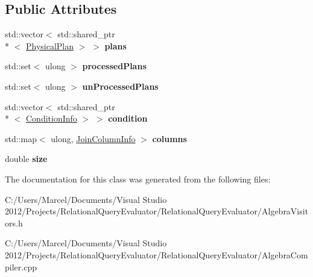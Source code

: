 \subsection*{Public Attributes}
\begin{DoxyCompactItemize}
\item 
\hypertarget{class_join_info_acbddcf9cd01e91396492b94a627bdf69}{std\+::vector$<$ std\+::shared\+\_\+ptr\\*
$<$ \hyperlink{class_physical_plan}{Physical\+Plan} $>$ $>$ {\bfseries plans}}\label{class_join_info_acbddcf9cd01e91396492b94a627bdf69}

\item 
\hypertarget{class_join_info_a584f1ea54151c8e0c506911a6595c7cb}{std\+::set$<$ ulong $>$ {\bfseries processed\+Plans}}\label{class_join_info_a584f1ea54151c8e0c506911a6595c7cb}

\item 
\hypertarget{class_join_info_ac6d0b302590c265ce7f3c47db28bad44}{std\+::set$<$ ulong $>$ {\bfseries un\+Processed\+Plans}}\label{class_join_info_ac6d0b302590c265ce7f3c47db28bad44}

\item 
\hypertarget{class_join_info_a0b9f3b02df4e768208f53c549e0b6e61}{std\+::vector$<$ std\+::shared\+\_\+ptr\\*
$<$ \hyperlink{class_condition_info}{Condition\+Info} $>$ $>$ {\bfseries condition}}\label{class_join_info_a0b9f3b02df4e768208f53c549e0b6e61}

\item 
\hypertarget{class_join_info_a4890e0bbeaf9718d16765b8f408ec1b5}{std\+::map$<$ ulong, \hyperlink{class_join_column_info}{Join\+Column\+Info} $>$ {\bfseries columns}}\label{class_join_info_a4890e0bbeaf9718d16765b8f408ec1b5}

\item 
\hypertarget{class_join_info_a526146b07ef6d1bba7475f7998bf0588}{double {\bfseries size}}\label{class_join_info_a526146b07ef6d1bba7475f7998bf0588}

\end{DoxyCompactItemize}


The documentation for this class was generated from the following files\+:\begin{DoxyCompactItemize}
\item 
C\+:/\+Users/\+Marcel/\+Documents/\+Visual Studio 2012/\+Projects/\+Relational\+Query\+Evaluator/\+Relational\+Query\+Evaluator/Algebra\+Visitors.\+h\item 
C\+:/\+Users/\+Marcel/\+Documents/\+Visual Studio 2012/\+Projects/\+Relational\+Query\+Evaluator/\+Relational\+Query\+Evaluator/Algebra\+Compiler.\+cpp\end{DoxyCompactItemize}
